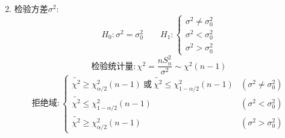 \begin{enumerate}
\begin{displaymath}
  \end{displaymath}
  \item 
  检验方差$\sigma^2$:
  \begin{displaymath}
    H_0:\sigma^2=\sigma_0^2 \qquad
    H_1: \begin{cases}
      \sigma^2\neq\sigma_0^2 \\
      \sigma^2 < \sigma_0^2 \\
      \sigma^2 > \sigma_0^2
    \end{cases}
  \end{displaymath}
  \begin{displaymath}
    \text{检验统计量}: \chi^2=\frac{nS_n^2}{\sigma^2}\sim \chi^2(n-1)
  \end{displaymath}
  \begin{displaymath}
    \text{拒绝域}: \begin{cases}
      \widetilde{\chi^2} \ge \chi^2_{\alpha/2}(n-1)
        \ \text{或}\ \widetilde{\chi^2} \le \chi^2_{1-\alpha/2}(n-1)
        & (\sigma^2\neq\sigma_0^2) \\
      \widetilde{\chi^2} \le \chi^2_{1-\alpha/2}(n-1)
        & (\sigma^2 < \sigma_0^2) \\
      \widetilde{\chi^2} \ge \chi^2_{\alpha/2}(n-1)
        & (\sigma^2 > \sigma_0^2)
    \end{cases}
  \end{displaymath}
\end{enumerate}

